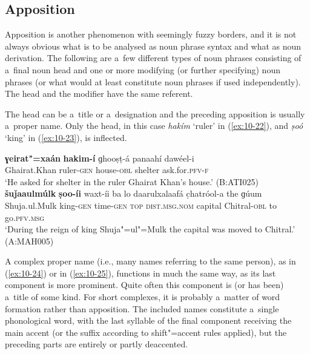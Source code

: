 \subsection{Apposition}
\label{subsec:10-1-3}

Apposition is another phenomenon with seemingly fuzzy borders, and it is not always obvious what is to be analysed as noun phrase syntax and what as noun derivation. The following are a~few different types of noun phrases consisting of a~final noun head and one or more modifying (or further specifying) noun phrases (or what would at least constitute noun phrases if used independently). The head and the modifier have the same referent.


The head can be a~title or a~designation and the preceding apposition is usually a~proper name. Only the head, in this case \textit{hakím} `ruler' in (\ref{ex:10-22}), and \textit{ṣoó} `king' in (\ref{ex:10-23}), is inflected.

\begin{exe}
\ex
\label{ex:10-22}
\gll \textbf{ɣeirat"=xaán} \textbf{hakim-í} ɡhooṣṭ-á panaahí dawéel-i \\
Ghairat.Khan ruler-\textsc{gen} house-\textsc{obl} shelter ask.for.\textsc{pfv-f} \\
\glt `He asked for shelter in the ruler Ghairat Khan's house.' (B:ATI025)
\ex
\label{ex:10-23}
\gll \textbf{šuǰaaulmúlk} \textbf{ṣoo-íi} waxt-íi ba lo daarulxalaafá c̣hatróol-a the ɡúum \\
Shuja.ul.Mulk king-\textsc{gen} time-\textsc{gen} \textsc{top} \textsc{dist.msg.nom}  capital Chitral-\textsc{obl} to go.\textsc{pfv.msg}  \\
\glt `During the reign of king Shuja"=ul"=Mulk the capital was moved to Chitral.' (A:MAH005)
\end{exe}

A complex proper name (i.e., many names referring to the same person), as in (\ref{ex:10-24}) or in (\ref{ex:10-25}), functions in much the same way, as its last component is more prominent. Quite often this component is (or has been) a~title of some kind. For short complexes, it is probably a~matter of word formation rather than apposition. The included names constitute a~single phonological word, with the last syllable of the final component receiving the main accent (or the suffix according to shift"=accent rules applied), but the preceding parts are entirely or partly deaccented.

